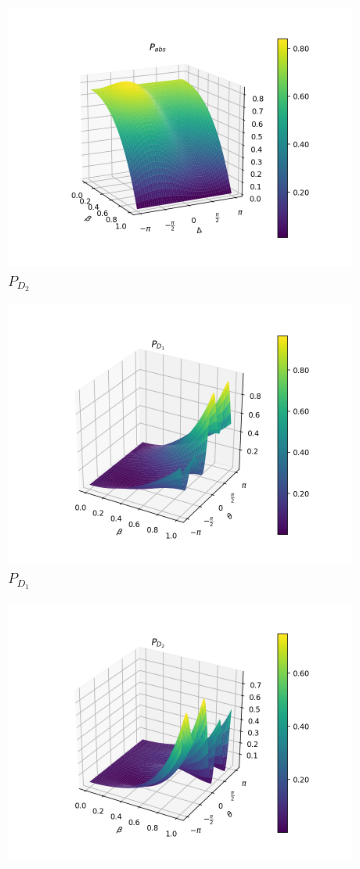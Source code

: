 \documentclass{book}
\begin{document}
\begin{figure}[H]
\begin{subfigure}[b]{0.30\linewidth}
\includegraphics[width=\linewidth]{images/pabs_3_pi4.png}
\caption{$P_{D_{2}}$ }
\label{fig:BS1}
\end{subfigure}
\begin{subfigure}[b]{0.30\linewidth}
\includegraphics[width=\linewidth]{images/pd1_5_pi4.png}
\caption{$P_{D_{1}}$ }
\label{fig:BS1}
\end{subfigure}
\begin{subfigure}[b]{0.30\linewidth}
\includegraphics[width=\linewidth]{images/pd2_5_pi4.png}

\end{subfigure}
\end{figure}
\end{document}
